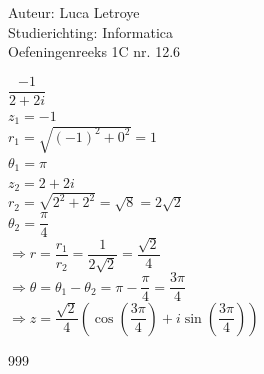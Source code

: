 \documentclass[a4paper]{article}
\begin{document}
  
\noindent \large Auteur: Luca Letroye        \\
\noindent \large Studierichting: Informatica \\
\noindent \large Oefeningenreeks 1C nr. 12.6 \\

\medskip

\normalsize

$\dfrac{-1}{2+2i}$\\

$z_1 = -1$\\

$r_1 = \sqrt{(-1)^2 + 0^2} = 1$\\

$ \theta_1 = \pi$\\

$z_2 = 2+2i$\\

$r_2 = \sqrt{2^2 + 2^2} = \sqrt{8} = 2\sqrt{2}$\\

$ \theta_2 = \dfrac{\pi}{4}$\\

$\Rightarrow r = \dfrac{r_1}{r_2} = \dfrac{1}{2\sqrt{2}} = \dfrac{\sqrt{2}}{4}$\\

$\Rightarrow \theta = \theta_1 - \theta_2 = \pi - \dfrac{\pi}{4} = \dfrac{3\pi}{4}$\\

$\Rightarrow z = \dfrac{\sqrt{2}}{4}\left(\cos\left(\dfrac{3\pi}{4}\right)+ i\sin\left(\dfrac{3\pi}{4}\right)\right)$







\begin{thebibliography}{999}
\end{thebibliography}
\end{document}
